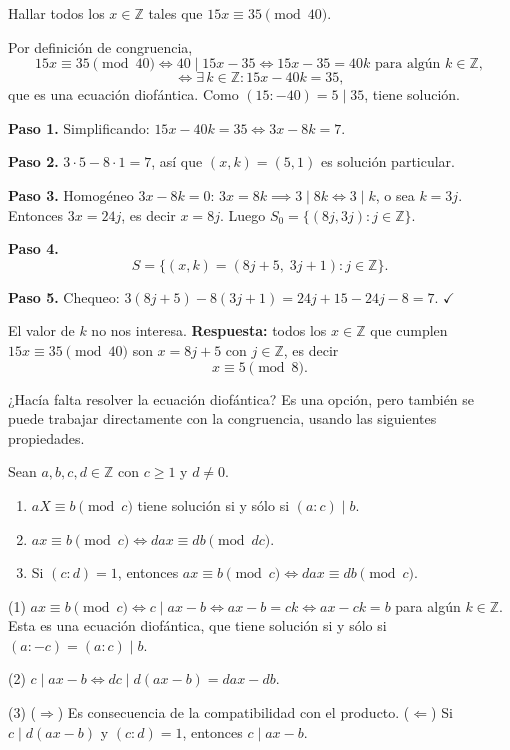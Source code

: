 \begin{ejemplo}
Hallar todos los $x\in\mathbb{Z}$ tales que $15x\equiv 35 \pmod{40}$.

Por definición de congruencia,
\[
15x\equiv 35 \pmod{40} \iff 40 \mid 15x-35 \iff 15x-35=40k \text{ para algún } k\in\mathbb{Z},
\]
\[
\iff \exists\, k\in\mathbb{Z} : 15x-40k=35,
\]
que es una ecuación diofántica. Como $(15:-40)=5\mid 35$, tiene solución.

\textbf{Paso 1.} Simplificando: $15x-40k=35 \iff 3x-8k=7$.

\textbf{Paso 2.} $3\cdot 5-8\cdot 1=7$, así que $(x,k)=(5,1)$ es solución particular.

\textbf{Paso 3.} Homogéneo $3x-8k=0$: $3x=8k \implies 3\mid 8k \iff 3\mid k$, o sea
$k=3j$. Entonces $3x=24j$, es decir $x=8j$. Luego $S_0=\{(8j,3j) : j\in\mathbb{Z}\}$.

\textbf{Paso 4.}
\[
S=\{(x,k)=(8j+5,\;3j+1) : j\in\mathbb{Z}\}.
\]

\textbf{Paso 5.} Chequeo: $3(8j+5)-8(3j+1)=24j+15-24j-8=7$. $\checkmark$

El valor de $k$ no nos interesa. \textbf{Respuesta:} todos los $x\in\mathbb{Z}$ que
cumplen $15x\equiv 35 \pmod{40}$ son $x=8j+5$ con $j\in\mathbb{Z}$, es decir
\[
x\equiv 5 \pmod 8.
\]
\end{ejemplo}

\begin{nota}{}
¿Hacía falta resolver la ecuación diofántica? Es una opción, pero también se
puede trabajar directamente con la congruencia, usando las siguientes
propiedades.
\end{nota}

\begin{proposicion}
Sean $a,b,c,d\in\mathbb{Z}$ con $c\ge 1$ y $d\neq 0$.
\begin{enumerate}
    \item $aX\equiv b \pmod c$ tiene solución si y sólo si $(a:c)\mid b$.
    \item $ax\equiv b \pmod c \iff dax\equiv db \pmod{dc}$.
    \item Si $(c:d)=1$, entonces $ax\equiv b \pmod c \iff dax\equiv db \pmod c$.
\end{enumerate}
\end{proposicion}

\begin{demostracion}
(1) $ax\equiv b \pmod c \iff c\mid ax-b \iff ax-b=ck \iff ax-ck=b$ para algún
$k\in\mathbb{Z}$. Esta es una ecuación diofántica, que tiene solución si y sólo
si $(a:-c)=(a:c)\mid b$.

(2) $c\mid ax-b \iff dc\mid d(ax-b)=dax-db$.

(3) ($\Rightarrow$) Es consecuencia de la compatibilidad con el producto. ($\Leftarrow$)
Si $c\mid d(ax-b)$ y $(c:d)=1$, entonces $c\mid ax-b$.
\end{demostracion}

